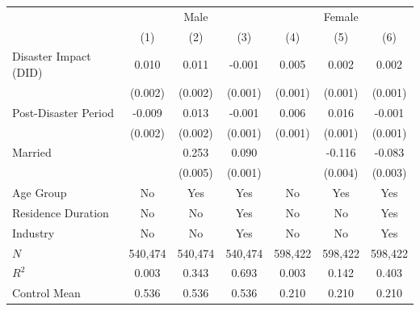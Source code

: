 \documentclass[serif, aspectratio=169]{beamer}
\begin{document}
\begin{frame}
\begin{table}[htbp]
\begin{tabular}{@{}l*{6}{c}@{}}
          &\multicolumn{3}{c}{Male}                                &\multicolumn{3}{c}{Female}                              \\\cmidrule(lr){2-4}\cmidrule(lr){5-7}
          &\multicolumn{1}{c}{(1)}         &\multicolumn{1}{c}{(2)}         &\multicolumn{1}{c}{(3)}         &\multicolumn{1}{c}{(4)}         &\multicolumn{1}{c}{(5)}         &\multicolumn{1}{c}{(6)}         \\
\toprule
Disaster Impact (DID)&    0.010\sym{***}&    0.011\sym{***}&   -0.001         &    0.005\sym{***}&    0.002         &    0.002\sym{**} \\
          &  (0.002)         &  (0.002)         &  (0.001)         &  (0.001)         &  (0.001)         &  (0.001)         \\
\addlinespace
Post-Disaster Period&   -0.009\sym{***}&    0.013\sym{***}&   -0.001         &    0.006\sym{***}&    0.016\sym{***}&   -0.001         \\
          &  (0.002)         &  (0.002)         &  (0.001)         &  (0.001)         &  (0.001)         &  (0.001)         \\
\addlinespace
Married   &                  &    0.253\sym{***}&    0.090\sym{***}&                  &   -0.116\sym{***}&   -0.083\sym{***}\\
          &                  &  (0.005)         &  (0.001)         &                  &  (0.004)         &  (0.003)         \\
\midrule
Age Group       &       No         &      Yes         &      Yes         &       No         &      Yes         &      Yes         \\
Residence Duration&       No         &       No         &      Yes         &       No         &       No         &      Yes         \\
Industry  &       No         &       No         &      Yes         &       No         &       No         &      Yes         \\
$\textit{N}$&  540,474         &  540,474         &  540,474         &  598,422         &  598,422         &  598,422         \\
$\textit{R}^2$&    0.003         &    0.343         &    0.693         &    0.003         &    0.142         &    0.403         \\
Control Mean&    0.536         &    0.536         &    0.536         &    0.210         &    0.210         &    0.210         \\

\end{tabular}
\end{table}
\end{frame}
\end{document}
